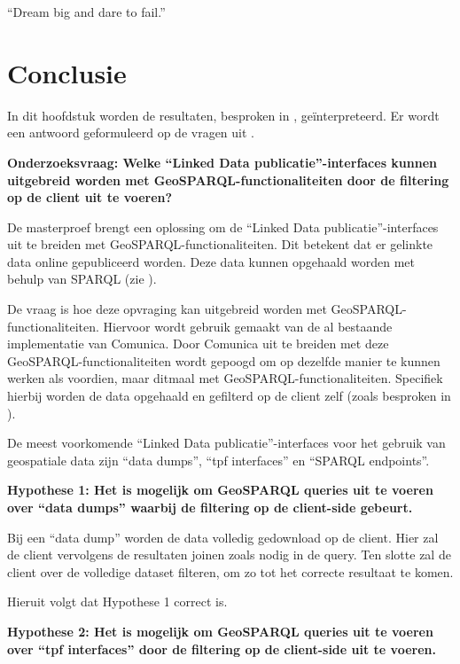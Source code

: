 \begin{savequote}[0.55\linewidth]
	``Dream big and dare to fail.''
\end{savequote}

\chapter{Conclusie}
\label{chap:conclusie}
In dit hoofdstuk worden de resultaten, besproken in , geïnterpreteerd. Er wordt een antwoord geformuleerd op de vragen uit .

\textbf{Onderzoeksvraag: Welke ``Linked Data publicatie''-interfaces kunnen uitgebreid worden met GeoSPARQL-functionaliteiten door de filtering op de client uit te voeren?}

De masterproef brengt een oplossing om de ``Linked Data publicatie''-interfaces uit te breiden met GeoSPARQL-functionaliteiten. Dit betekent dat er gelinkte data online gepubliceerd worden. Deze data kunnen opgehaald worden met behulp van SPARQL (zie ). 

De vraag is hoe deze opvraging kan uitgebreid worden met GeoSPARQL-functionaliteiten. Hiervoor wordt gebruik gemaakt van de al bestaande implementatie van Comunica. Door Comunica uit te breiden met deze GeoSPARQL-functionaliteiten wordt gepoogd om op dezelfde manier te kunnen werken als voordien, maar ditmaal met GeoSPARQL-functionaliteiten. Specifiek hierbij worden de data opgehaald en gefilterd op de client zelf (zoals besproken in ).

De meest voorkomende ``Linked Data publicatie''-interfaces voor het gebruik van geospatiale data zijn ``data dumps'', ``\acrshort{tpf} interfaces'' en ``SPARQL endpoints''.

\textbf{Hypothese 1: Het is mogelijk om GeoSPARQL queries uit te voeren over ``data dumps'' waarbij de filtering op de client-side gebeurt.}

Bij een ``data dump'' worden de data volledig gedownload op de client. Hier zal de client vervolgens de resultaten joinen zoals nodig in de query. Ten slotte zal de client over de volledige dataset filteren, om zo tot het correcte resultaat te komen. 

Hieruit volgt dat Hypothese 1 correct is.

\textbf{Hypothese 2: Het is mogelijk om GeoSPARQL queries uit te voeren over ``\acrshort{tpf} interfaces'' door de filtering op de client-side uit te voeren.}

